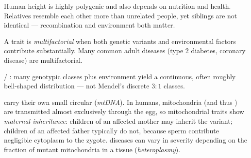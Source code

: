 \begin{example}[Height]\label{ex:g11:human-genetics:height}
Human height is highly polygenic and also depends on nutrition and health.
Relatives resemble each other more than unrelated people, yet siblings are not
identical --- recombination and environment both matter.
\end{example}

\begin{definition}[Multifactorial]\label{def:g11:human-genetics:multifactorial}
A trait is \emph{multifactorial} when both genetic
variants and environmental factors contribute substantially. Many common adult
diseases (type 2 diabetes, coronary disease) are multifactorial.
\end{definition}

\begin{omfigure}

{\small {} / : many genotypic classes plus
environment yield a continuous, often roughly bell-shaped distribution --- not
Mendel's discrete $3:1$ classes.}
\end{omfigure}

\begin{remark}
\label{rem:g11:human-genetics:mtDNA}
 carry their own small circular  (\emph{mtDNA}).
In humans, mitochondria (and thus ) are transmitted almost exclusively
through the egg, so mitochondrial traits show
\emph{maternal inheritance}: children of an
affected mother may inherit the variant; children of an affected father
typically do not, because sperm contribute negligible cytoplasm to the zygote.
 diseases can vary in severity depending on the fraction of mutant
mitochondria in a tissue (\emph{heteroplasmy}).
\end{remark}

